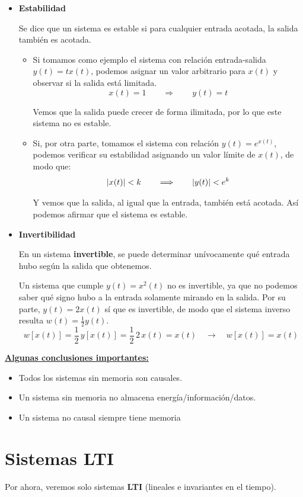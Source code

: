 \documentclass[a4paper]{book}
\begin{document}
\begin{itemize}
\item \textbf{Estabilidad}

Se dice que un sistema es estable si para cualquier entrada acotada, la salida también es acotada.
\begin{itemize}
\item Si tomamos como ejemplo el sistema con relación entrada-salida $y(t) = tx(t)$, podemos asignar un valor arbitrario para $x(t)$ y observar si la salida está limitada. \[x(t) = 1 \qquad \Longrightarrow \qquad y(t) = t\]

Vemos que la salida puede crecer de forma ilimitada, por lo que este sistema no es estable.
\item Si, por otra parte, tomamos el sistema con relación $y(t) = e^{x(t)}$, podemos verificar su estabilidad asignando un valor límite de $x(t)$, de modo que: \[\abs{x(t)} < k \qquad \Longrightarrow \qquad \abs{y(t)} < e^k\]

Y vemos que la salida, al igual que la entrada, también está acotada. Así podemos afirmar que el sistema es estable.
\end{itemize}


\item \textbf{Invertibilidad}

En un sistema \textbf{invertible}, se puede determinar unívocamente qué entrada hubo según la salida que obtenemos.

Un sistema que cumple $y(t) = x^2(t)$ no es invertible, ya que no podemos saber qué signo hubo a la entrada solamente mirando en la salida. Por su parte, $y(t) = 2x(t)$ sí que es invertible, de modo que el sistema inverso resulta $w(t) = \frac{1}{2}y(t)$. \[w \left[ x(t) \right] = \frac{1}{2}\,  y\left[ x(t) \right] = \frac{1}{2}\, 2\, x(t) = x(t) \quad \longrightarrow \quad \boxed{ w \left[ x(t) \right] = x(t)}\]

\end{itemize}

\underline{\textbf{Algunas conclusiones importantes:}}
\begin{itemize}
	\item Todos los sistemas sin memoria son causales.
	\item Un sistema sin memoria no almacena energía/información/datos.
	\item Un sistema no causal siempre tiene memoria
\end{itemize}





\section{Sistemas LTI}
Por ahora, veremos solo sistemas \textbf{LTI} (lineales e invariantes en el tiempo).
\end{document}
